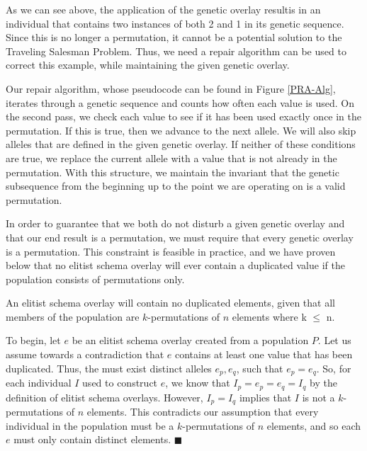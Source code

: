 As we can see above, the application of the genetic overlay resultis in an individual that contains two instances of both 2 and 1 in its genetic sequence. Since this is no longer a permutation, it cannot be a potential solution to the Traveling Salesman Problem. Thus, we need a repair algorithm can be used to correct this example, while maintaining the given genetic overlay. 

Our repair algorithm, whose pseudocode can be found in Figure \ref{PRA-Alg}, iterates through a genetic sequence and counts how often each value is used. On the second pass, we check each value to see if it has been used exactly once in the permutation. If this is true, then we advance to the next allele. We will also skip alleles that are defined in the given genetic overlay. If neither of these conditions are true, we replace the current allele with a value that is not already in the permutation. With this structure, we maintain the invariant that the genetic subsequence from the beginning up to the point we are operating on is a valid permutation.

In order to guarantee that we both do not disturb a given genetic overlay and that our end result is a permutation, we must require that every genetic overlay is a permutation. This constraint is feasible in practice, and we have proven below that no elitist schema overlay will ever contain a duplicated value if the population consists of permutations only.

\begin{thm}
An elitist schema overlay will contain no duplicated elements, given that all members of the population are $k$-permutations of $n$ elements where k $\leq$ n.
\end{thm}

To begin, let $e$ be an elitist schema overlay created from a population $P$. Let us assume towards a contradiction that $e$ contains at least one value that has been duplicated. Thus, the must exist distinct alleles $e_p, e_q$, such that $e_p = e_q$. So, for each individual $I$ used to construct $e$, we know that $I_p = e_p = e_q = I_q$ by the definition of elitist schema overlays. However, $I_p = I_q$ implies that $I$ is not a $k$-permutations of $n$ elements. This contradicts our assumption that every individual in the population must be a $k$-permutations of $n$ elements, and so each $e$ must only contain distinct elements. $\blacksquare$

